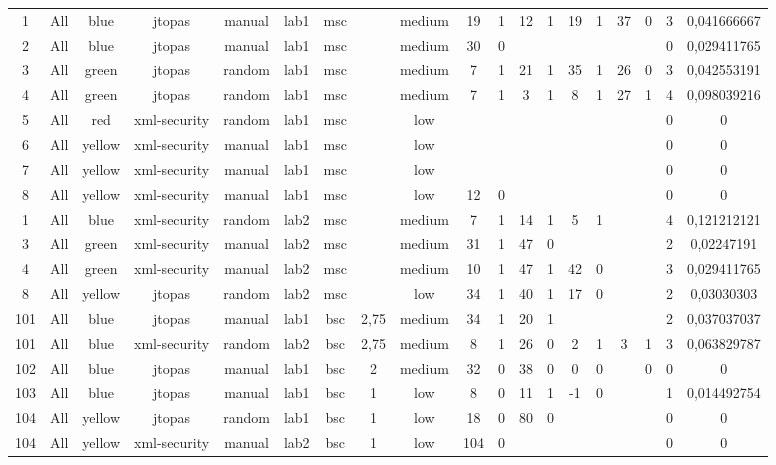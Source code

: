 \begin{table}[ht]
\begin{tabular}{c c c c c c c c c c c c c c c c c c c}
\\1 & All & blue & jtopas & manual & lab1 & msc &  & medium & 19 & 1 & 12 & 1 & 19 & 1 & 37 & 0 & 3 & 0,041666667
\\2 & All & blue & jtopas & manual & lab1 & msc &  & medium & 30 & 0 &  &  &  &  &  &  & 0 & 0,029411765
\\3 & All & green & jtopas & random & lab1 & msc &  & medium & 7 & 1 & 21 & 1 & 35 & 1 & 26 & 0 & 3 & 0,042553191
\\4 & All & green & jtopas & random & lab1 & msc &  & medium & 7 & 1 & 3 & 1 & 8 & 1 & 27 & 1 & 4 & 0,098039216
\\5 & All & red & xml-security & random & lab1 & msc &  & low &  &  &  &  &  &  &  &  & 0 & 0
\\6 & All & yellow & xml-security & manual & lab1 & msc &  & low &  &  &  &  &  &  &  &  & 0 & 0
\\7 & All & yellow & xml-security & manual & lab1 & msc &  & low &  &  &  &  &  &  &  &  & 0 & 0
\\8 & All & yellow & xml-security & manual & lab1 & msc &  & low & 12 & 0 &  &  &  &  &  &  & 0 & 0
\\1 & All & blue & xml-security & random & lab2 & msc &  & medium & 7 & 1 & 14 & 1 & 5 & 1 &  &  & 4 & 0,121212121
\\3 & All & green & xml-security & manual & lab2 & msc &  & medium & 31 & 1 & 47 & 0 &  &  &  &  & 2 & 0,02247191
\\4 & All & green & xml-security & manual & lab2 & msc &  & medium & 10 & 1 & 47 & 1 & 42 & 0 &  &  & 3 & 0,029411765
\\8 & All & yellow & jtopas & random & lab2 & msc &  & low & 34 & 1 & 40 & 1 & 17 & 0 &  &  & 2 & 0,03030303
\\101 & All & blue & jtopas & manual & lab1 & bsc & 2,75 & medium & 34 & 1 & 20 & 1 &  &  &  &  & 2 & 0,037037037
\\101 & All & blue & xml-security & random & lab2 & bsc & 2,75 & medium & 8 & 1 & 26 & 0 & 2 & 1 & 3 & 1 & 3 & 0,063829787
\\102 & All & blue & jtopas & manual & lab1 & bsc & 2 & medium & 32 & 0 & 38 & 0 & 0 & 0 &  & 0 & 0 & 0
\\103 & All & blue & jtopas & manual & lab1 & bsc & 1 & low & 8 & 0 & 11 & 1 & -1 & 0 &  &  & 1 & 0,014492754
\\104 & All & yellow & jtopas & random & lab1 & bsc & 1 & low & 18 & 0 & 80 & 0 &  &  &  &  & 0 & 0
\\104 & All & yellow & xml-security & manual & lab2 & bsc & 1 & low & 104 & 0 &  &  &  &  &  &  & 0 & 0

\end{tabular}
\end{table}
